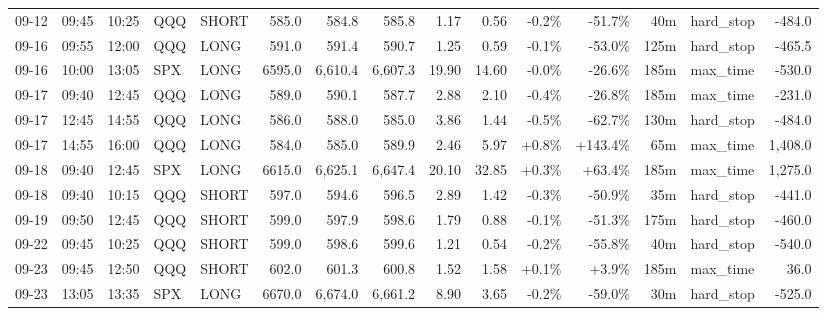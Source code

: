 \documentclass[11pt,a4paper,twoside]{article}
\begin{document}
\begin{landscape}
\begin{center}
\begin{longtable}{>{\color{txtmain}}l l l l l r r r r r r r r >{\color{txtmain}}l r}
09-12 & 09:45 & 10:25 & QQQ & SHORT & 585.0 & 584.8 & 585.8 & 1.17 & 0.56 & \textcolor{lossred}{-0.2\%} & \textcolor{lossred}{-51.7\%} & 40m & hard\_stop & \textcolor{lossred}{-484.0} \\
09-16 & 09:55 & 12:00 & QQQ & LONG & 591.0 & 591.4 & 590.7 & 1.25 & 0.59 & \textcolor{lossred}{-0.1\%} & \textcolor{lossred}{-53.0\%} & 125m & hard\_stop & \textcolor{lossred}{-465.5} \\
09-16 & 10:00 & 13:05 & SPX & LONG & 6595.0 & 6,610.4 & 6,607.3 & 19.90 & 14.60 & \textcolor{lossred}{-0.0\%} & \textcolor{lossred}{-26.6\%} & 185m & max\_time & \textcolor{lossred}{-530.0} \\
09-17 & 09:40 & 12:45 & QQQ & LONG & 589.0 & 590.1 & 587.7 & 2.88 & 2.10 & \textcolor{lossred}{-0.4\%} & \textcolor{lossred}{-26.8\%} & 185m & max\_time & \textcolor{lossred}{-231.0} \\
09-17 & 12:45 & 14:55 & QQQ & LONG & 586.0 & 588.0 & 585.0 & 3.86 & 1.44 & \textcolor{lossred}{-0.5\%} & \textcolor{lossred}{-62.7\%} & 130m & hard\_stop & \textcolor{lossred}{-484.0} \\
09-17 & 14:55 & 16:00 & QQQ & LONG & 584.0 & 585.0 & 589.9 & 2.46 & 5.97 & \textcolor{wingreen}{+0.8\%} & \textcolor{wingreen}{+143.4\%} & 65m & max\_time & \textcolor{wingreen}{1,408.0} \\
09-18 & 09:40 & 12:45 & SPX & LONG & 6615.0 & 6,625.1 & 6,647.4 & 20.10 & 32.85 & \textcolor{wingreen}{+0.3\%} & \textcolor{wingreen}{+63.4\%} & 185m & max\_time & \textcolor{wingreen}{1,275.0} \\
09-18 & 09:40 & 10:15 & QQQ & SHORT & 597.0 & 594.6 & 596.5 & 2.89 & 1.42 & \textcolor{lossred}{-0.3\%} & \textcolor{lossred}{-50.9\%} & 35m & hard\_stop & \textcolor{lossred}{-441.0} \\
09-19 & 09:50 & 12:45 & QQQ & SHORT & 599.0 & 597.9 & 598.6 & 1.79 & 0.88 & \textcolor{lossred}{-0.1\%} & \textcolor{lossred}{-51.3\%} & 175m & hard\_stop & \textcolor{lossred}{-460.0} \\
09-22 & 09:45 & 10:25 & QQQ & SHORT & 599.0 & 598.6 & 599.6 & 1.21 & 0.54 & \textcolor{lossred}{-0.2\%} & \textcolor{lossred}{-55.8\%} & 40m & hard\_stop & \textcolor{lossred}{-540.0} \\
09-23 & 09:45 & 12:50 & QQQ & SHORT & 602.0 & 601.3 & 600.8 & 1.52 & 1.58 & \textcolor{wingreen}{+0.1\%} & \textcolor{wingreen}{+3.9\%} & 185m & max\_time & \textcolor{wingreen}{36.0} \\
09-23 & 13:05 & 13:35 & SPX & LONG & 6670.0 & 6,674.0 & 6,661.2 & 8.90 & 3.65 & \textcolor{lossred}{-0.2\%} & \textcolor{lossred}{-59.0\%} & 30m & hard\_stop & \textcolor{lossred}{-525.0} \\

\end{longtable}
\end{center}
\end{landscape}
\end{document}
